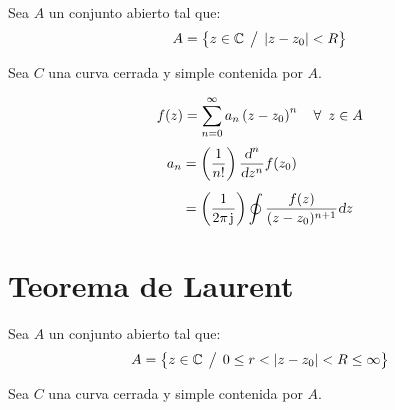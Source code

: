 Sea $A$ un conjunto abierto tal que:
\begin{equation*}
    A = { \left\{ {z \in \mathbb{C} \hspace{1ex} \big/ \hspace{1ex} {\left| {z-z_0} \right|}<R} \right\} }
\end{equation*}

Sea $C$ una curva cerrada y simple contenida por $A$.

\begin{center}
    \def\svgwidth{0.6\linewidth}
    
\end{center}

\begin{mdframed}[style=PropertyFrame]
    \begin{prop}
    \end{prop}
    \begin{equation*}
        f(z) = \sum_{n=0}^\infty a_n \left(z-z_0\right)^n \quad \forall \enspace z \in A
    \end{equation*}
    \begin{align*}
        a_n &= \left( \frac{1}{n!} \right) \frac{\textsl{d}^n}{\textsl{d} z^n} f(z_0)
        \\[1ex]
        &= \left( \frac{1}{2 \pi \mkern2mu\mathrm{j}\mkern1mu} \right) \oint \frac{f(z)}{(z-z_0)^{n+1}} \textsl{d} z
    \end{align*}
\end{mdframed}


\section{Teorema de Laurent}
\label{sec:Laurent}

Sea $A$ un conjunto abierto tal que:
\begin{equation*}
    A = { \left\{ {z \in \mathbb{C} \hspace{1ex} \big/ \hspace{1ex} 0 \leq r< {\left| {z-z_0} \right|}<R \leq \infty} \right\} }
\end{equation*}

Sea $C$ una curva cerrada y simple contenida por $A$.

\begin{center}
    \def\svgwidth{0.6\linewidth}
    
\end{center}

